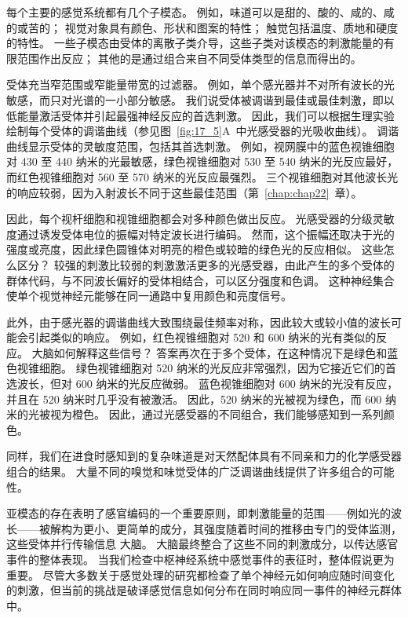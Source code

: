 每个主要的感觉系统都有几个子模态。 
例如，味道可以是甜的、酸的、咸的、咸的或苦的； 
视觉对象具有颜色、形状和图案的特性； 
触觉包括温度、质地和硬度的特性。 
一些子模态由受体的离散子类介导，这些子类对该模态的刺激能量的有限范围作出反应； 
其他的是通过组合来自不同受体类型的信息而得出的。


受体充当窄范围或窄能量带宽的过滤器。 
例如，单个感光器并不对所有波长的光敏感，而只对光谱的一小部分敏感。 
我们说受体被调谐到最佳或最佳刺激，即以低能量激活受体并引起最强神经反应的首选刺激。 
因此，我们可以根据生理实验绘制每个受体的调谐曲线（参见图~\ref{fig:17_5}A~中光感受器的光吸收曲线）。 
调谐曲线显示受体的灵敏度范围，包括其首选刺激。
例如，视网膜中的蓝色视锥细胞对 430 至 440 纳米的光最敏感，绿色视锥细胞对 530 至 540 纳米的光反应最好，而红色视锥细胞对 560 至 570 纳米的光反应最强烈。 
三个视锥细胞对其他波长光的响应较弱，因为入射波长不同于这些最佳范围（第~\ref{chap:chap22}~章）。


因此，每个视杆细胞和视锥细胞都会对多种颜色做出反应。 
光感受器的分级灵敏度通过诱发受体电位的振幅对特定波长进行编码。 
然而，这个振幅还取决于光的强度或亮度，因此绿色圆锥体对明亮的橙色或较暗的绿色光的反应相似。 
这些怎么区分？ 
较强的刺激比较弱的刺激激活更多的光感受器，由此产生的多个受体的群体代码，与不同波长偏好的受体相结合，可以区分强度和色调。 
这种神经集合使单个视觉神经元能够在同一通路中复用颜色和亮度信号。


此外，由于感光器的调谐曲线大致围绕最佳频率对称，因此较大或较小值的波长可能会引起类似的响应。 
例如，红色视锥细胞对 520 和 600 纳米的光有类似的反应。 
大脑如何解释这些信号？ 
答案再次在于多个受体，在这种情况下是绿色和蓝色视锥细胞。 
绿色视锥细胞对 520 纳米的光反应非常强烈，因为它接近它们的首选波长，但对 600 纳米的光反应微弱。 
蓝色视锥细胞对 600 纳米的光没有反应，并且在 520 纳米时几乎没有被激活。 
因此，520 纳米的光被视为绿色，而 600 纳米的光被视为橙色。 
因此，通过光感受器的不同组合，我们能够感知到一系列颜色。


同样，我们在进食时感知到的复杂味道是对天然配体具有不同亲和力的化学感受器组合的结果。 
大量不同的嗅觉和味觉受体的广泛调谐曲线提供了许多组合的可能性。


亚模态的存在表明了感官编码的一个重要原则，即刺激能量的范围——例如光的波长——被解构为更小、更简单的成分，其强度随着时间的推移由专门的受体监测，这些受体并行传输信息 大脑。
大脑最终整合了这些不同的刺激成分，以传达感官事件的整体表现。 
当我们检查中枢神经系统中感觉事件的表征时，整体假说更为重要。 
尽管大多数关于感觉处理的研究都检查了单个神经元如何响应随时间变化的刺激，但当前的挑战是破译感觉信息如何分布在同时响应同一事件的神经元群体中。


